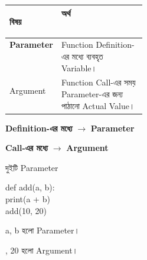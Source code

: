 \begin{tabularx}
{\linewidth}
{
|>{\bfseries\RaggedRight\arraybackslash}p{0.27\linewidth}
|Y|
}

\hline
{}

\textbf{বিষয়}
&
\textbf{অর্থ}
\\
\hline

Parameter
&
Function Definition-এর মধ্যে ব্যবহৃত Variable।
\\
\hline

Argument
&
Function Call-এর সময় Parameter-এর জন্য পাঠানো Actual Value।
\\
\hline

\end{tabularx}

\begin{rememberbox}

\begin{center}

\textbf{Definition-এর মধ্যে}
\(\longrightarrow\)
\textbf{Parameter}

\qquad

\textbf{Call-এর মধ্যে}
\(\longrightarrow\)
\textbf{Argument}

\end{center}

\end{rememberbox}



\begin{codeoutputbox}{দুইটি Parameter}

\noindent
\begin{minipage}[t]{0.53\linewidth}
\codeheading

\begin{english}
\ttfamily
def add(a, b):\\
\hspace*{4mm}print(a + b)\\[0.5mm]
add(10, 20)
\end{english}

\end{minipage}
\hfill
\begin{minipage}[t]{0.43\linewidth}
\outputheading

\begin{center}
\textenglish{}
\end{center}

\textenglish{\ttfamily a, b}
হলো Parameter।

\textenglish{, 20}
হলো Argument।

\end{minipage}

\end{codeoutputbox}

